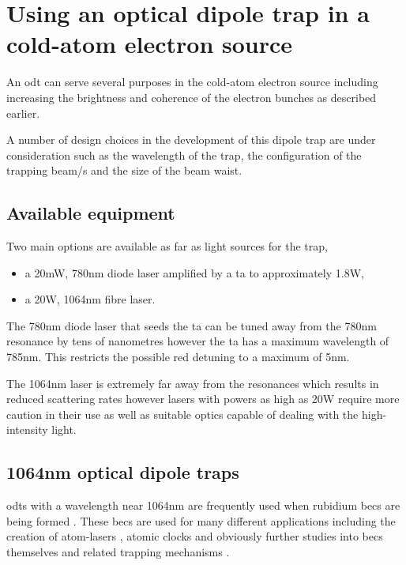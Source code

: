 \section{Using an optical dipole trap in a cold-atom electron source}
An \gls{odt} can serve several purposes in the cold-atom electron source including increasing the brightness and coherence of the electron bunches as described earlier.

A number of design choices in the development of this dipole trap are under consideration such as the wavelength of the trap, the configuration of the trapping beam/s and the size of the beam waist.

\subsection{Available equipment}
Two main options are available as far as light sources for the trap,
\begin{itemize}
    \item a 20mW, 780nm diode laser amplified by a \gls{ta} to approximately 1.8W,
    \item a 20W, 1064nm fibre laser.
\end{itemize}

The 780nm diode laser that seeds the \gls{ta} can be tuned away from the 780nm resonance by tens of nanometres however the \gls{ta} has a maximum wavelength of 785nm. This restricts the possible red detuning to a maximum of 5nm.

The 1064nm laser is extremely far away from the resonances which results in reduced scattering rates however lasers with powers as high as 20W require more caution in their use as well as suitable optics capable of dealing with the high-intensity light.

\subsection{1064nm optical dipole traps}
\Glspl{odt} with a wavelength near 1064nm are frequently used when rubidium \glspl{bec} are being formed \cite{chikkatur_continuous_2002, couvert_quasi-monomode_2008, kleine_buning_slow_2010, lin_rapid_2009, arnold_all-optical_2011, fu_bose-einstein_2011}. These \glspl{bec} are used for many different applications including the creation of atom-lasers \cite{kleine_buning_slow_2010, chikkatur_continuous_2002, couvert_quasi-monomode_2008}, atomic clocks\cite{kleine_buning_extended_2011} and obviously further studies into \glspl{bec} themselves and related trapping mechanisms \cite{arnold_all-optical_2011, fu_bose-einstein_2011, lin_rapid_2009}.

